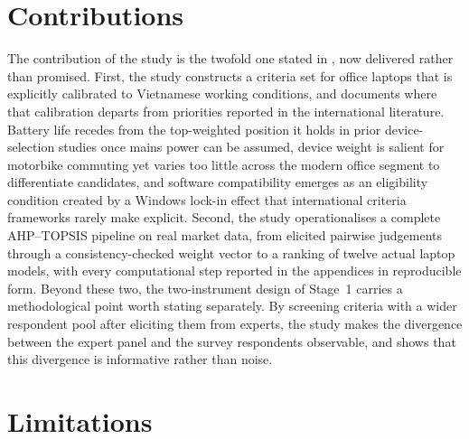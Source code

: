 \section{Contributions}\label{sec:contributions}

The contribution of the study is the twofold one stated in , now
delivered rather than promised. First, the study constructs a criteria set for office
laptops that is explicitly calibrated to Vietnamese working conditions, and documents
where that calibration departs from priorities reported in the international literature.
Battery life recedes from the top-weighted position it holds in prior device-selection
studies once mains power can be assumed, device weight is salient for motorbike commuting
yet varies too little across the modern office segment to differentiate candidates, and
software compatibility emerges as an eligibility condition created by a Windows lock-in
effect that international criteria frameworks rarely make explicit. Second, the study
operationalises a complete AHP--TOPSIS pipeline on real market data, from elicited
pairwise judgements through a consistency-checked weight vector to a ranking of twelve
actual laptop models, with every computational step reported in the appendices in
reproducible form. Beyond these two, the two-instrument design of Stage~1 carries a
methodological point worth stating separately. By screening criteria with a wider
respondent pool after eliciting them from experts, the study makes the divergence between
the expert panel and the survey respondents observable, and  shows
that this divergence is informative rather than noise.

\section{Limitations}\label{sec:limitations}


